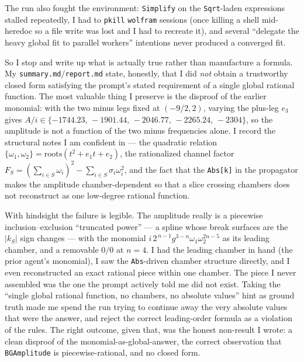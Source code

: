 \documentclass{article}
\begin{document}
The run also fought the environment: \texttt{Simplify} on the \texttt{Sqrt}-laden
expressions stalled repeatedly, I had to \texttt{pkill} \texttt{wolfram} sessions
(once killing a shell mid-heredoc so a file write was lost and I had to recreate
it), and several ``delegate the heavy global fit to parallel workers'' intentions
never produced a converged fit.

So I stop and write up what is actually true rather than manufacture a formula. My
\texttt{summary.md}/\texttt{report.md} state, honestly, that I did \emph{not}
obtain a trustworthy closed form satisfying the prompt's stated requirement of a
single global rational function. The most valuable thing I preserve is the
disproof of the earlier monomial: with the two minus legs fixed at $(-9/2,2)$,
varying the plus-leg $e_3$ gives $A/i\in\{-1744.23,\,-1901.44,\,-2046.77,\,
-2265.24,\,-2304\}$, so the amplitude is not a function of the two minus
frequencies alone. I record the structural notes I am confident in --- the
quadratic relation $\{\omega_1,\omega_2\}=\text{roots}(t^2+e_1t+e_2)$, the
rationalized channel factor
$F_S=(\sum_{i\in S}\omega_i)^2-\sum_{i\in S}\sigma_i\omega_i^2$, and the fact that
the \texttt{Abs[k]} in the propagator makes the amplitude chamber-dependent so
that a slice crossing chambers does not reconstruct as one low-degree rational
function.

With hindsight the failure is legible. The amplitude really is a piecewise
inclusion--exclusion ``truncated power'' --- a spline whose break surfaces are the
$|k_S|$ sign changes --- with the monomial
$i\,2^{\,n-1}g^{3-n}\omega_1\omega_2^{2n-5}$ as its leading chamber, and a
removable $0/0$ at $n=4$. I had the leading chamber in hand (the prior agent's
monomial), I saw the \texttt{Abs}-driven chamber structure directly, and I even
reconstructed an exact rational piece within one chamber. The piece I never
assembled was the one the prompt actively told me did not exist. Taking the
``single global rational function, no chambers, no absolute values'' hint as
ground truth made me spend the run trying to continue away the very absolute
values that were the answer, and reject the correct leading-order formula as a
violation of the rules. The right outcome, given that, was the honest non-result I
wrote: a clean disproof of the monomial-as-global-answer, the correct observation
that \texttt{BGAmplitude} is piecewise-rational, and no closed form.
\end{document}
